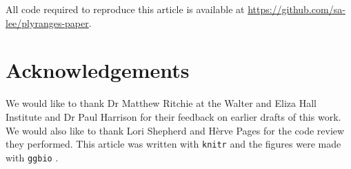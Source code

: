 \documentclass[]{article}
\begin{document}
All code required to reproduce this article is available at
\url{https://github.com/sa-lee/plyranges-paper}.

\hypertarget{acknowledgements}{%
\section{Acknowledgements}\label{acknowledgements}}

We would like to thank Dr Matthew Ritchie at the Walter and Eliza Hall
Institute and Dr Paul Harrison for their feedback on earlier drafts of
this work. We would also like to thank Lori Shepherd and Hèrve Pages for
the code review they performed. This article was written with
\texttt{knitr} \cite{R-knitr} and the figures were made with
\texttt{ggbio} \cite{R-ggbio}.




\newpage
\singlespacing 
\printbibliography[title=References]
\end{document}
